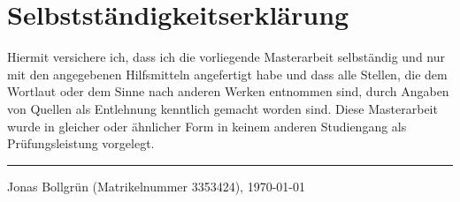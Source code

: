 \thispagestyle{empty}
\newpage

\chapter*{Selbstständigkeitserklärung}
Hiermit versichere ich, dass ich die vorliegende Masterarbeit selbständig und
nur mit den angegebenen Hilfsmitteln angefertigt habe und dass alle Stellen,
die dem Wortlaut oder dem Sinne nach anderen Werken entnommen sind,
durch Angaben von Quellen als Entlehnung kenntlich gemacht worden sind.
Diese Masterarbeit wurde in gleicher oder ähnlicher Form in keinem anderen
Studiengang als Prüfungsleistung vorgelegt.

\vspace*{8ex}
\hrule
\vspace*{2ex}
Jonas Bollgrün (Matrikelnummer 3353424), \today

